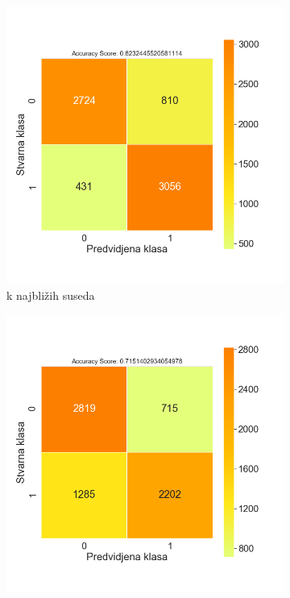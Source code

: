 \documentclass[12pt,oneside]{memoir}
\begin{document}
\begin{figure}[!ht]
    \centering
    \begin{subfigure}[b]{0.45\textwidth}
        \centering
        \includegraphics[width=\textwidth]{KNN_oversampled_confussion_matrix}
        \caption{k najbližih suseda}
        \label{fig:knear2}
    \end{subfigure}
    \begin{subfigure}[b]{0.45\textwidth}
        \centering
        \includegraphics[width=\textwidth]{LR_oversampled_confussion_matrix}

\end{subfigure}
\end{figure}
\end{document}
